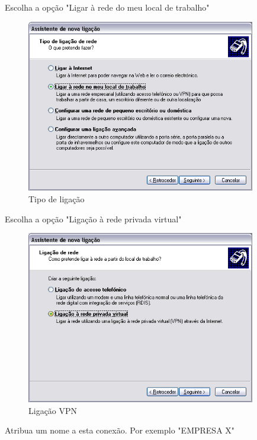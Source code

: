 Escolha a opção "Ligar à rede do meu local de trabalho"

\begin{figure}[H]
    \begin{center}
        \includegraphics[width=10cm]{include/img/xp_f3}
    \end{center}
    \caption{Tipo de ligação}
    \label{fig:XPF3}
\end{figure}

Escolha a opção "Ligação à rede privada virtual"

\begin{figure}[H]
    \begin{center}
        \includegraphics[width=10cm]{include/img/xp_f4}
    \end{center}
    \caption{Ligação VPN}
    \label{fig:XPF4}
\end{figure}

Atribua um nome a esta conexão. Por exemplo "EMPRESA X"

